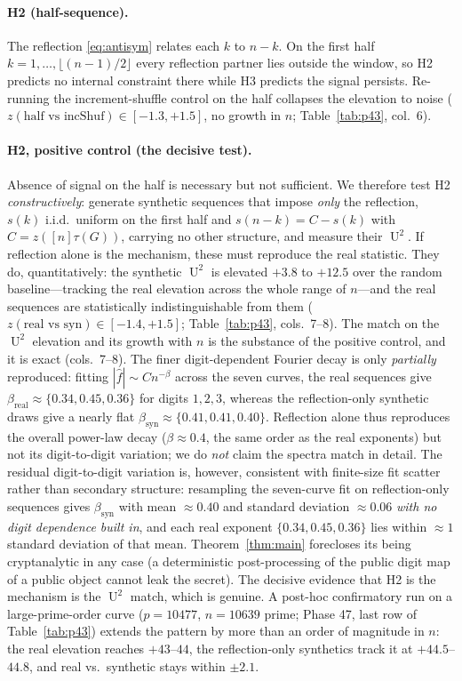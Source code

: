 \documentclass[11pt]{article}
\theoremstyle{definition}
\DeclareMathOperator{\Uk}{U}
\begin{document}
\paragraph{H2 (half-sequence).} The reflection \eqref{eq:antisym} relates
each $k$ to $n-k$. On the first half $k=1,\dots,\lfloor(n-1)/2\rfloor$
every reflection partner lies outside the window, so H2 predicts no
internal constraint there while H3 predicts the signal persists.
Re-running the increment-shuffle control on the half collapses the
elevation to noise ($z(\text{half vs incShuf})\in[-1.3,+1.5]$, no growth
in $n$; Table~\ref{tab:p43}, col.\ 6).

\paragraph{H2, positive control (the decisive test).} Absence of signal
on the half is necessary but not sufficient. We therefore test H2
\emph{constructively}: generate synthetic sequences that impose
\emph{only} the reflection, $s(k)$ i.i.d.\ uniform on the first half and
$s(n-k)=C-s(k)$ with $C=z([n]\tau(G))$, carrying no other structure, and
measure their $\Uk^2$. If reflection alone is the mechanism, these must
reproduce the real statistic. They do, quantitatively: the synthetic
$\Uk^2$ is elevated $+3.8$ to $+12.5$ over the random baseline---tracking
the real elevation across the whole range of $n$---and the real sequences
are statistically indistinguishable from them
($z(\text{real vs syn})\in[-1.4,+1.5]$; Table~\ref{tab:p43}, cols.\
7--8). The match on the $\Uk^2$ elevation and its growth with $n$ is the
substance of the positive control, and it is exact (cols.\ 7--8). The
finer digit-dependent Fourier decay is only \emph{partially} reproduced:
fitting $|\hat f|\sim C n^{-\beta}$ across the seven curves, the real
sequences give $\beta_{\mathrm{real}}\approx\{0.34,0.45,0.36\}$ for
digits $1,2,3$, whereas the reflection-only synthetic draws give a nearly
flat $\beta_{\mathrm{syn}}\approx\{0.41,0.41,0.40\}$. Reflection alone
thus reproduces the overall power-law decay ($\beta\approx0.4$, the same
order as the real exponents) but not its digit-to-digit variation; we do
\emph{not} claim the spectra match in detail. The residual
digit-to-digit variation is, however, consistent with finite-size fit
scatter rather than secondary structure: resampling the seven-curve fit
on reflection-only sequences gives $\beta_{\mathrm{syn}}$ with mean
$\approx0.40$ and standard deviation $\approx0.06$ \emph{with no digit
dependence built in}, and each real exponent $\{0.34,0.45,0.36\}$ lies
within $\approx1$ standard deviation of that mean. Theorem~\ref{thm:main}
forecloses its being cryptanalytic in any case (a deterministic
post-processing of the public digit map of a public object cannot leak
the secret). The decisive evidence that
H2 is the mechanism is the $\Uk^2$ match, which is genuine.
A post-hoc confirmatory run on a large-prime-order curve ($p=10477$,
$n=10639$ prime; Phase 47, last row of Table~\ref{tab:p43}) extends the
pattern by more than an order of magnitude in $n$: the real elevation
reaches $+43$--$44$, the reflection-only synthetics track it at
$+44.5$--$44.8$, and real vs.\ synthetic stays within $\pm2.1$.
\end{document}
